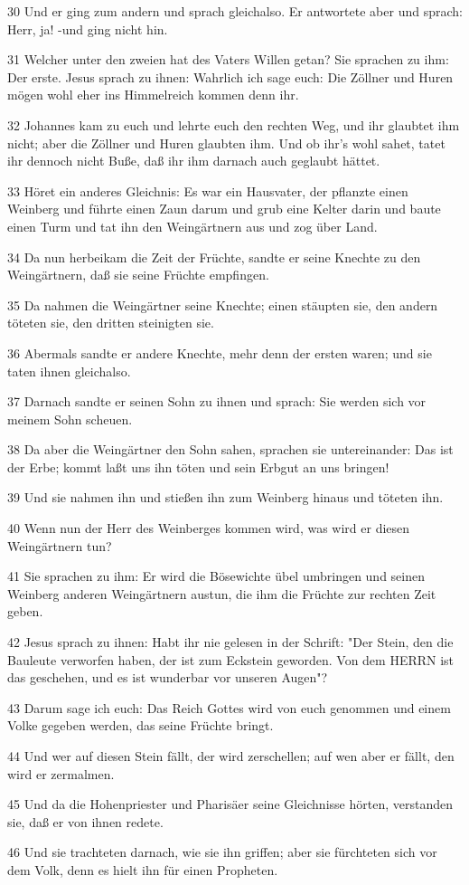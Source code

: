 \par 30 Und er ging zum andern und sprach gleichalso. Er antwortete aber und sprach: Herr, ja! -und ging nicht hin.
\par 31 Welcher unter den zweien hat des Vaters Willen getan? Sie sprachen zu ihm: Der erste. Jesus sprach zu ihnen: Wahrlich ich sage euch: Die Zöllner und Huren mögen wohl eher ins Himmelreich kommen denn ihr.
\par 32 Johannes kam zu euch und lehrte euch den rechten Weg, und ihr glaubtet ihm nicht; aber die Zöllner und Huren glaubten ihm. Und ob ihr's wohl sahet, tatet ihr dennoch nicht Buße, daß ihr ihm darnach auch geglaubt hättet.
\par 33 Höret ein anderes Gleichnis: Es war ein Hausvater, der pflanzte einen Weinberg und führte einen Zaun darum und grub eine Kelter darin und baute einen Turm und tat ihn den Weingärtnern aus und zog über Land.
\par 34 Da nun herbeikam die Zeit der Früchte, sandte er seine Knechte zu den Weingärtnern, daß sie seine Früchte empfingen.
\par 35 Da nahmen die Weingärtner seine Knechte; einen stäupten sie, den andern töteten sie, den dritten steinigten sie.
\par 36 Abermals sandte er andere Knechte, mehr denn der ersten waren; und sie taten ihnen gleichalso.
\par 37 Darnach sandte er seinen Sohn zu ihnen und sprach: Sie werden sich vor meinem Sohn scheuen.
\par 38 Da aber die Weingärtner den Sohn sahen, sprachen sie untereinander: Das ist der Erbe; kommt laßt uns ihn töten und sein Erbgut an uns bringen!
\par 39 Und sie nahmen ihn und stießen ihn zum Weinberg hinaus und töteten ihn.
\par 40 Wenn nun der Herr des Weinberges kommen wird, was wird er diesen Weingärtnern tun?
\par 41 Sie sprachen zu ihm: Er wird die Bösewichte übel umbringen und seinen Weinberg anderen Weingärtnern austun, die ihm die Früchte zur rechten Zeit geben.
\par 42 Jesus sprach zu ihnen: Habt ihr nie gelesen in der Schrift: "Der Stein, den die Bauleute verworfen haben, der ist zum Eckstein geworden. Von dem HERRN ist das geschehen, und es ist wunderbar vor unseren Augen"?
\par 43 Darum sage ich euch: Das Reich Gottes wird von euch genommen und einem Volke gegeben werden, das seine Früchte bringt.
\par 44 Und wer auf diesen Stein fällt, der wird zerschellen; auf wen aber er fällt, den wird er zermalmen.
\par 45 Und da die Hohenpriester und Pharisäer seine Gleichnisse hörten, verstanden sie, daß er von ihnen redete.
\par 46 Und sie trachteten darnach, wie sie ihn griffen; aber sie fürchteten sich vor dem Volk, denn es hielt ihn für einen Propheten.

